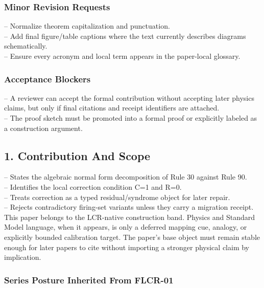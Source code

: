 \documentclass[11pt]{article}
\begin{document}
\subsubsection*{Minor Revision Requests}

\noindent{}-- Normalize theorem capitalization and punctuation.\\
\noindent{}-- Add final figure/table captions where the text currently describes diagrams schematically.\\
\noindent{}-- Ensure every acronym and local term appears in the paper-local glossary.\\

\subsubsection*{Acceptance Blockers}

\noindent{}-- A reviewer can accept the formal contribution without accepting later physics claims, but only if final citations and receipt identifiers are attached.\\
\noindent{}-- The proof sketch must be promoted into a formal proof or explicitly labeled as a construction argument.\\


\subsection*{1. Contribution And Scope}

\noindent{}-- States the algebraic normal form decomposition of Rule 30 against Rule 90.\\
\noindent{}-- Identifies the local correction condition C=1 and R=0.\\
\noindent{}-- Treats correction as a typed residual/syndrome object for later repair.\\
\noindent{}-- Rejects contradictory firing-set variants unless they carry a migration receipt.\\

This paper belongs to the LCR-native construction band. Physics and Standard Model language, when it appears, is only a deferred mapping cue, analogy, or explicitly bounded calibration target. The paper's base object must remain stable enough for later papers to cite without importing a stronger physical claim by implication.

\subsubsection*{Series Posture Inherited From FLCR-01}
\end{document}
